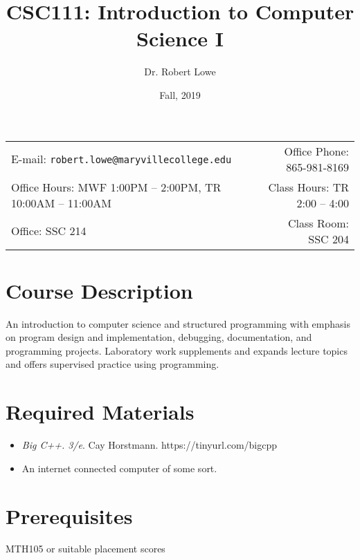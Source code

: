 \documentclass[11pt]{article}
\title{CSC111: Introduction to Computer Science I}
\author{Dr. Robert Lowe}
\date{Fall, 2019}
\newcommand{\blankline}{\quad\pagebreak[2]}
\begin{document}
\maketitle

\blankline

\begin{tabular*}{.93\textwidth}{@{\extracolsep{\fill}}lr}

E-mail: \texttt{robert.lowe@maryvillecollege.edu} & Office Phone: 865-981-8169 \\

 Office Hours: MWF 1:00PM -- 2:00PM, TR 10:00AM -- 11:00AM  &  Class Hours: TR 2:00 -- 4:00\\
 Office: SSC 214 & Class Room: SSC 204\\
\hline
\end{tabular*}

\vspace{5 mm}

\section*{Course Description}
An introduction to computer science and structured programming with
emphasis on program design and implementation, debugging,
documentation, and programming projects. Laboratory work supplements
and expands lecture topics and offers supervised practice using
programming. 


\section*{Required Materials}
\begin{itemize}
    \item {\em Big C++. 3/e}. Cay Horstmann.
    https://tinyurl.com/bigcpp
    \item An internet connected computer of some sort.
\end{itemize}

\section*{Prerequisites}
MTH105 or suitable placement scores
\end{document}
